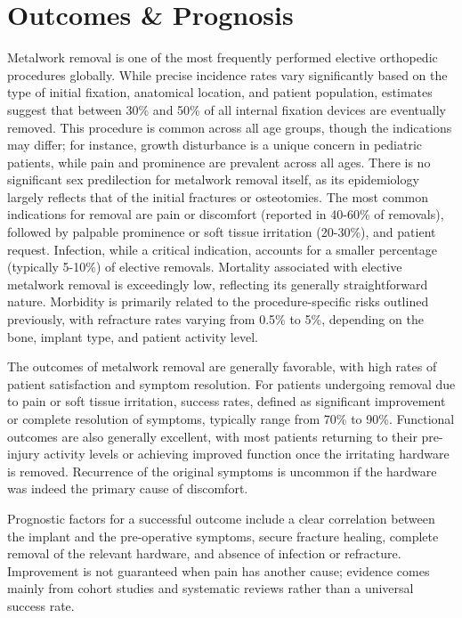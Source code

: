 \section*{Outcomes \& Prognosis}
Metalwork removal is one of the most frequently performed elective orthopedic procedures globally. While precise incidence rates vary significantly based on the type of initial fixation, anatomical location, and patient population, estimates suggest that between 30\% and 50\% of all internal fixation devices are eventually removed. This procedure is common across all age groups, though the indications may differ; for instance, growth disturbance is a unique concern in pediatric patients, while pain and prominence are prevalent across all ages. There is no significant sex predilection for metalwork removal itself, as its epidemiology largely reflects that of the initial fractures or osteotomies. The most common indications for removal are pain or discomfort (reported in 40-60\% of removals), followed by palpable prominence or soft tissue irritation (20-30\%), and patient request. Infection, while a critical indication, accounts for a smaller percentage (typically 5-10\%) of elective removals. Mortality associated with elective metalwork removal is exceedingly low, reflecting its generally straightforward nature. Morbidity is primarily related to the procedure-specific risks outlined previously, with refracture rates varying from 0.5\% to 5\%, depending on the bone, implant type, and patient activity level.

The outcomes of metalwork removal are generally favorable, with high rates of patient satisfaction and symptom resolution. For patients undergoing removal due to pain or soft tissue irritation, success rates, defined as significant improvement or complete resolution of symptoms, typically range from 70\% to 90\%. Functional outcomes are also generally excellent, with most patients returning to their pre-injury activity levels or achieving improved function once the irritating hardware is removed. Recurrence of the original symptoms is uncommon if the hardware was indeed the primary cause of discomfort.

Prognostic factors for a successful outcome include a clear correlation between the implant and the pre-operative symptoms, secure fracture healing, complete removal of the relevant hardware, and absence of infection or refracture. Improvement is not guaranteed when pain has another cause; evidence comes mainly from cohort studies and systematic reviews rather than a universal success rate.

